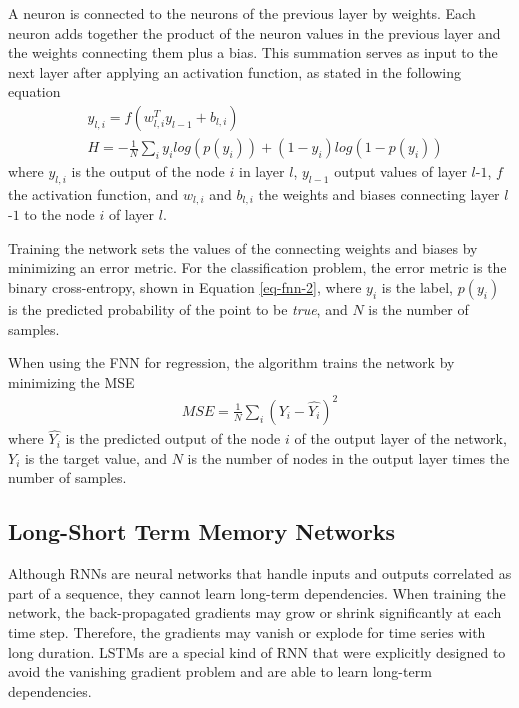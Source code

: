 A neuron is connected to the neurons of the previous layer by weights.
Each neuron adds together the product of the neuron values in the previous layer and the weights connecting them plus a bias.
This summation serves as input to the next layer after applying an activation function, as stated in the following equation
\begin{align}
& y_{l, i} = f(w_{l, i}^T y_{l-1} + b_{l, i}) \label{eq-fnn-1} \\
& H = -\frac{1}{N} \sum_i y_i log(p(y_i)) + (1 - y_i) log(1 - p(y_i)) \label{eq-fnn-2}
\end{align}
where $y_{l, i}$ is the output of the node $i$ in layer $l$, $y_{l-1}$ output values of layer $l$-$1$, $f$ the activation function, and $w_{l, i}$ and $b_{l, i}$ the weights and biases connecting layer $l$-$1$ to the node $i$ of layer $l$.

Training the network sets the values of the connecting weights and biases by minimizing an error metric.
For the classification problem, the error metric is the binary cross-entropy, shown in Equation \ref{eq-fnn-2}, where $y_i$ is the label, $p(y_i)$ is the predicted probability of the point to be \textit{true}, and $N$ is the number of samples.

When using the FNN for regression, the algorithm trains the network by minimizing the MSE
\begin{align}
MSE = \frac{1}{N} \sum_i (Y_i - \hat{Y_i})^2 \label{eq-MSE}
\end{align}
where $\hat{Y_i}$ is the predicted output of the node $i$ of the output layer of the network, $Y_i$ is the target value, and $N$ is the number of nodes in the output layer times the number of samples.


\subsection{Long-Short Term Memory Networks}
\label{sec:lstm}

Although RNNs are neural networks that handle inputs and outputs correlated as part of a sequence, they cannot learn long-term dependencies.
When training the network, the back-propagated gradients may grow or shrink significantly at each time step.
Therefore, the gradients may vanish or explode for time series with long duration.
LSTMs are a special kind of RNN that were explicitly designed to avoid the vanishing gradient problem and are able to learn long-term dependencies.


